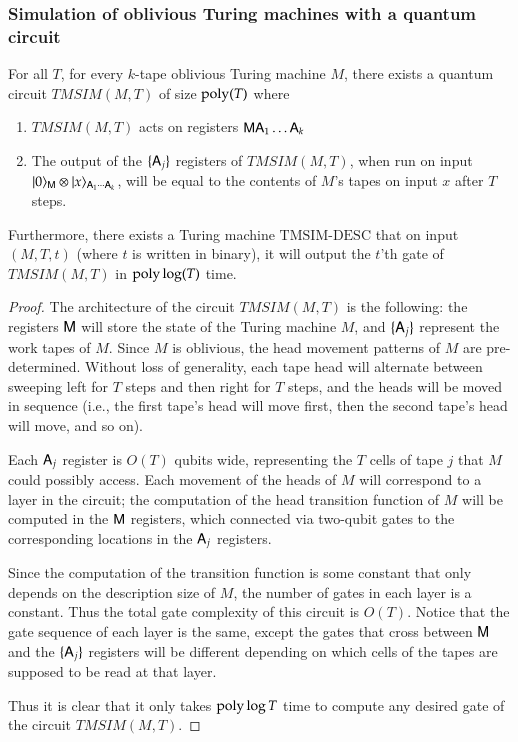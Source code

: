 \subsubsection{Simulation of oblivious Turing machines with a quantum circuit}

\begin{lemma}\label{lem:tmsim}
	For all $T$, for every $k$-tape oblivious Turing machine $M$, there exists a quantum circuit $TMSIM(M,T)$ of size $\operatorname{poly}(T)$ where
	\begin{enumerate}
		\item $TMSIM(M,T)$ acts on registers ${\mathsf{M}} {\mathsf{A}}_1 \ldots {\mathsf{A}}_k$
		\item The output of the $\{{\mathsf{A}}_j\}$ registers of $TMSIM(M,T)$, when run on input $|0\rangle_{{\mathsf{M}}} \otimes |x\rangle_{{\mathsf{A}}_1 \cdots {\mathsf{A}}_k}$, will be equal to the contents of $M$'s tapes on input $x$ after $T$ steps.
	\end{enumerate}
	Furthermore, there exists a Turing machine $\text{TMSIM-DESC}$ that on input $(M,T,t)$ (where $t$ is written in binary), it will output the $t$'th gate of $TMSIM(M,T)$ in $\operatorname{poly}\log(T)$ time. 
\end{lemma}

\begin{proof}
	The architecture of the circuit $TMSIM(M,T)$ is the following: the registers ${\mathsf{M}}$ will store the state of the Turing machine $M$, and $\{{\mathsf{A}}_j\}$ represent the work tapes of $M$. Since $M$ is oblivious, the head movement patterns of $M$ are pre-determined. Without loss of generality, each tape head will alternate between sweeping left for $T$ steps and then right for $T$ steps, and the heads will be moved in sequence (i.e., the first tape's head will move first, then the second tape's head will move, and so on). 
	
	Each ${\mathsf{A}}_j$ register is $O(T)$ qubits wide, representing the $T$ cells of tape $j$ that $M$ could possibly access. Each movement of the heads of $M$ will correspond to a layer in the circuit; the computation of the head transition function of $M$ will be computed in the ${\mathsf{M}}$ registers, which connected via two-qubit gates to the corresponding locations in the ${\mathsf{A}}_j$ registers. 
	
	Since the computation of the transition function is some constant that only depends on the description size of $M$, the number of gates in each layer is a constant. Thus the total gate complexity of this circuit is $O(T)$. Notice that the gate sequence of each layer is the same, except the gates that cross between ${\mathsf{M}}$ and the $\{{\mathsf{A}}_j\}$ registers will be different depending on which cells of the tapes are supposed to be read at that layer. 
	
	Thus it is clear that it only takes $\operatorname{poly}\log T$ time to compute any desired gate of the circuit $TMSIM(M,T)$.
\end{proof}

